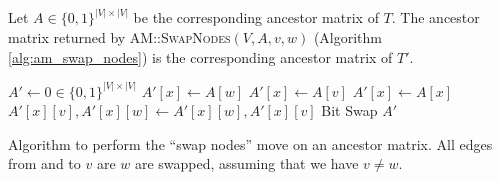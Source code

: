 \begin{theorem}
    \label{theo:swap_nodes_correctness}
    Let $A \in \{0,1\}^{|V| \times |V|}$ be the corresponding ancestor matrix of $T$. The ancestor matrix returned by \textsc{AM::SwapNodes}$(V, A, v, w)$ (Algorithm \ref{alg:am_swap_nodes}) is the corresponding ancestor matrix of $T'$.
\end{theorem}

\begin{algorithm}
    \begin{algorithmic}[1]
            \State $A' \leftarrow 0 \in \{0,1\}^{|V| \times |V|}$
                    \State $A'[x] \leftarrow A[w]$
                    \State $A'[x] \leftarrow A[v]$
                \Else
                    \State $A'[x] \leftarrow A[x]$
                \EndIf
                \State $A'[x][v], A'[x][w] \leftarrow A'[x][w], A'[x][v]$ \Comment Bit Swap
            \EndFor
            \State \Return $A'$
        \EndFunction
    \end{algorithmic}
    \caption{Algorithm to perform the ``swap nodes'' move on an ancestor matrix. All edges from and to $v$ are $w$ are swapped, assuming that we have $v \neq w$.}
    \label{alg:am_swap_nodes}
\end{algorithm}

